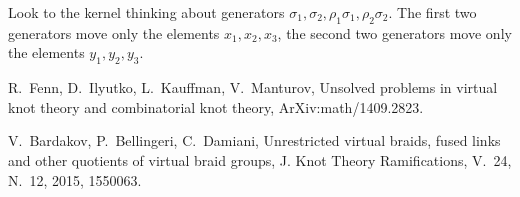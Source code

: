 \documentclass{article}
\begin{document}
Look to the kernel thinking about generators $\sigma_1, \sigma_2, \rho_1\sigma_1,\rho_2\sigma_2$. The first two generators move only the elements $x_1,x_2,x_3$, the second two generators move only the elements $y_1,y_2,y_3$.



\begin{thebibliography}{00}


R.~Fenn, D.~Ilyutko, L.~Kauffman, V.~Manturov, Unsolved problems in virtual knot theory and combinatorial knot theory, ArXiv:math/1409.2823.


V.~Bardakov, P.~Bellingeri, C.~Damiani, Unrestricted virtual braids, fused links and other quotients of virtual braid groups, J. Knot Theory Ramifications, V.~24, N.~12, 2015, 1550063.

\end{thebibliography}
\end{document}
